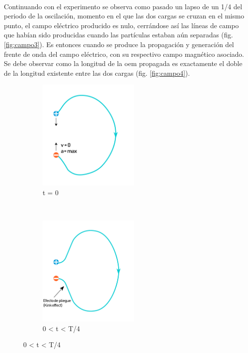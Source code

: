 \\
\par Continuando con el experimento se observa como pasado un lapso de un 1/4 del periodo de la oscilación, momento en el que las dos cargas se cruzan en el mismo punto, el campo eléctrico producido es nulo, cerrándose así las líneas de campo que habían sido producidas cuando las partículas estaban aún separadas (fig. \ref{fig:campo3}). Es entonces cuando se produce la propagación y generación del frente de onda del campo eléctrico, con su respectivo campo magnético asociado. Se debe observar como la longitud de la \gls{oem} propagada es exactamente el doble de la longitud existente entre las dos cargas (fig. \ref{fig:campo4}).\\

\begin{figure}[h]
\centering
	\begin{subfigure}[b]{0.3\textwidth} %
		\centering
		\includegraphics[width=5cm]{archivos/campos/campos1} %
		\caption{t = 0}
		\label{fig:campo1}
	\end{subfigure}
~ %
	\begin{subfigure}[b]{0.3\textwidth} %
	\centering
		\includegraphics[width=5cm]{archivos/campos/campos2} %
		\caption{0 < t < T/4}

\end{subfigure}
\end{figure}
